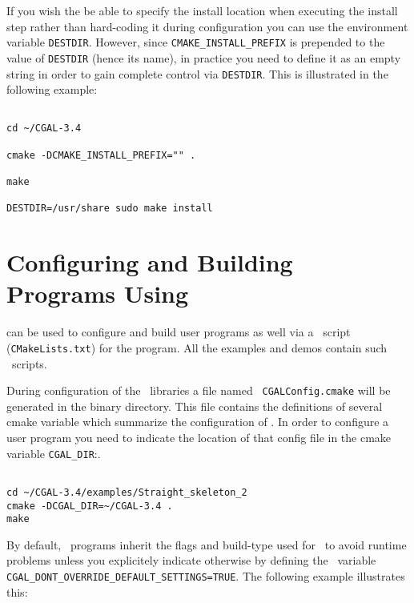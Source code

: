 If you wish the be able to specify the install location when executing the install step rather than hard-coding it during
configuration you can use the environment variable \texttt{DESTDIR}. However, since \texttt{CMAKE\_INSTALL\_PREFIX} is prepended
to the value of \texttt{DESTDIR} (hence its name), in practice you need to define it as an empty string in order to gain complete
control via \texttt{DESTDIR}.
This is illustrated in the following example:

{\ccTexHtml{\scriptsize}{}
\begin{verbatim}

cd ~/CGAL-3.4

cmake -DCMAKE_INSTALL_PREFIX="" . 

make

DESTDIR=/usr/share sudo make install

\end{verbatim}
}



\section{Configuring and Building Programs Using \cgal}

\cmake can be used to configure and build user programs as well via a \cmake\ 
script ({\tt CMakeLists.txt}) for the program.  All the examples and
demos contain such \cmake\ scripts.

During configuration of the \cgal\ libraries a file named {\tt
CGALConfig.cmake} will be generated in the binary directory. This file
contains the definitions of several cmake variable which summarize the
configuration of \cgal. In order to configure a user program you need
to indicate the location of that config file in the cmake variable
\texttt{CGAL\_DIR}:.

{\ccTexHtml{\scriptsize}{}
\begin{verbatim}

cd ~/CGAL-3.4/examples/Straight_skeleton_2
cmake -DCGAL_DIR=~/CGAL-3.4 .
make

\end{verbatim}
}

By default, \cgal\ programs inherit the flags and build-type used
for \cgal\ to avoid runtime problems unless you explicitely indicate otherwise by
defining the \cmake\ variable {\tt CGAL\_DONT\_OVERRIDE\_DEFAULT\_SETTINGS=TRUE}.
The following example illustrates this:

